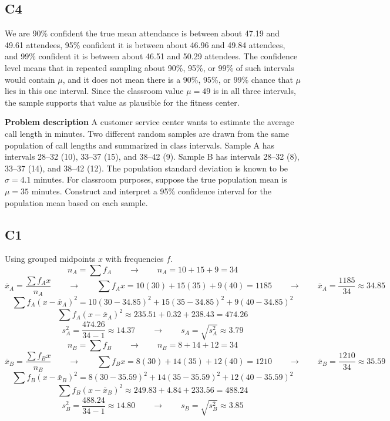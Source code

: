 \begin{ExamProblems}
		\subsection*{C4}
		We are 90\% confident the true mean attendance is between about 47.19 and 49.61 attendees, 95\% confident it is between about 46.96 and 49.84 attendees, and 99\% confident it is between about 46.51 and 50.29 attendees. The confidence level means that in repeated sampling about 90\%, 95\%, or 99\% of such intervals would contain $\mu$, and it does not mean there is a 90\%, 95\%, or 99\% chance that $\mu$ lies in this one interval. Since the classroom value $\mu = 49$ is in all three intervals, the sample supports that value as plausible for the fitness center.

		\newpage
		\item
		\textbf{Problem description}
		A customer service center wants to estimate the average call length in minutes.
		Two different random samples are drawn from the same population of call lengths and summarized in class intervals.
		Sample A has intervals 28--32 (10), 33--37 (15), and 38--42 (9).
		Sample B has intervals 28--32 (8), 33--37 (14), and 38--42 (12).
		The population standard deviation is known to be \(\sigma = 4.1\) minutes.
		For classroom purposes, suppose the true population mean is \(\mu = 35\) minutes.
		Construct and interpret a 95\% confidence interval for the population mean based on each sample.

		\subsection*{C1}
		Using grouped midpoints $x$ with frequencies $f$.
		\[
		n_A = \sum f_A \qquad \longrightarrow \qquad n_A = 10 + 15 + 9 = 34
		\]
		\[
		\bar{x}_A = \frac{\sum f_A x}{n_A} \qquad \longrightarrow \qquad \sum f_A x = 10(30) + 15(35) + 9(40) = 1185 \qquad \longrightarrow \qquad \bar{x}_A = \frac{1185}{34} \approx 34.85
		\]
		\[
		\sum f_A(x-\bar{x}_A)^2 = 10(30-34.85)^2 + 15(35-34.85)^2 + 9(40-34.85)^2
		\]
		\[
		\sum f_A(x-\bar{x}_A)^2 \approx 235.51 + 0.32 + 238.43 = 474.26
		\]
		\[
		s_A^2 = \frac{474.26}{34-1} \approx 14.37 \qquad \longrightarrow \qquad s_A = \sqrt{s_A^2} \approx 3.79
		\]
		\[
		n_B = \sum f_B \qquad \longrightarrow \qquad n_B = 8 + 14 + 12 = 34
		\]
		\[
		\bar{x}_B = \frac{\sum f_B x}{n_B} \qquad \longrightarrow \qquad \sum f_B x = 8(30) + 14(35) + 12(40) = 1210 \qquad \longrightarrow \qquad \bar{x}_B = \frac{1210}{34} \approx 35.59
		\]
		\[
		\sum f_B(x-\bar{x}_B)^2 = 8(30-35.59)^2 + 14(35-35.59)^2 + 12(40-35.59)^2
		\]
		\[
		\sum f_B(x-\bar{x}_B)^2 \approx 249.83 + 4.84 + 233.56 = 488.24
		\]
		\[
		s_B^2 = \frac{488.24}{34-1} \approx 14.80 \qquad \longrightarrow \qquad s_B = \sqrt{s_B^2} \approx 3.85
		\]


\end{ExamProblems}
